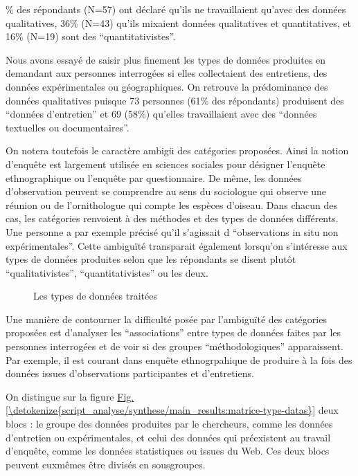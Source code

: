 \documentclass[letterpaper,10pt,english]{jupyterBook}
\begin{document}
\% des répondants (N=57) ont déclaré qu’ils ne travaillaient qu’avec des données qualitatives, 36\% (N=43) qu’ils mixaient données qualitatives et quantitatives, et 16\% (N=19) sont des “quantitativistes”.

\sphinxAtStartPar
Nous avons essayé de saisir plus finement les types de données produites en demandant aux personnes interrogées si elles collectaient des entretiens, des données expérimentales ou géographiques. On retrouve la prédominance des données qualitatives puisque 73 personnes (61\% des répondants) produisent des “données d’entretien” et 69 (58\%) qu’elles travaillaient avec des “données textuelles ou documentaires”.

\sphinxAtStartPar
On notera toutefois le caractère ambigü des catégories proposées. Ainsi la notion d’enquête est largement utilisée en sciences sociales pour désigner l’enquête ethnographique ou l’enquête par questionnaire. De même, les données d’observation peuvent se comprendre au sens du sociologue qui observe une réunion ou de l’ornithologue qui compte les espèces d’oiseau. Dans chacun des cas, les catégories renvoient à des méthodes et des types de données différents. Une personne a par exemple précisé qu’il s’agissait d “observations in situ non expérimentales”. Cette ambiguïté transparait également lorsqu’on s’intéresse aux types de données produites selon que les répondants se disent plutôt “qualitativistes”, “quantitativistes” ou les deux.

\begin{figure}[htbp]
\centering
\capstart

\noindent{}
\caption{Les types de données traitées}\label{\detokenize{script_analyse/synthese/main_results:type-donnee-quali}}\end{figure}

\sphinxAtStartPar
Une manière de contourner la difficulté posée par l’ambiguïté des catégories proposées est d’analyser les “associations” entre types de données faites par les personnes interrogées et de voir si des groupes “méthodologiques” apparaissent. Par exemple, il est courant dans enquête ethnogrpahique de produire à la fois des données issues d’observations participantes et d’entretiens.

\sphinxAtStartPar
On distingue sur la figure \hyperref[\detokenize{script_analyse/synthese/main_results:matrice-type-datas}]{Fig.\@ \ref{\detokenize{script_analyse/synthese/main_results:matrice-type-datas}}} deux blocs : le groupe des données produites par le chercheurs, comme les données d’entretien ou expérimentales, et celui des données qui préexistent au travail d’enquête, comme les données statistiques ou issues du Web. Ces deux blocs peuvent eux\sphinxhyphen{}mêmes être divisés en sous\sphinxhyphen{}groupes.
\end{document}
